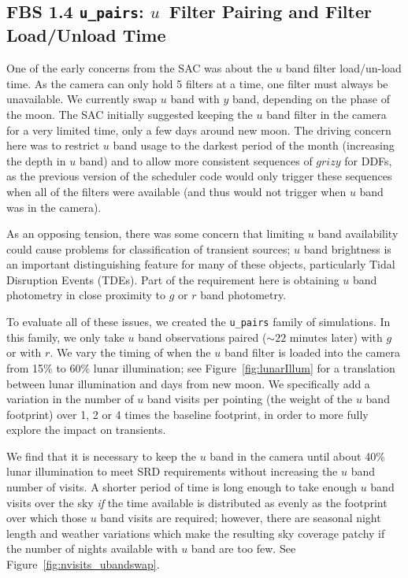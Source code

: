 \subsection{FBS 1.4 {\tt u\_pairs}:  $u$\ Filter Pairing and Filter Load/Unload Time}\label{ss:u_pairs}

One of the early concerns from the SAC was about the $u$ band filter load/un-load time. As the camera can only hold 5 filters at a time, one filter must always be unavailable. We currently swap $u$ band with $y$ band, depending on the phase of the moon. The SAC initially suggested keeping the $u$ band filter in the camera for a very limited time, only a few days around new moon. The driving concern here was to restrict $u$ band usage to the darkest period of the month (increasing the depth in $u$ band) and to allow more consistent sequences of $grizy$ for DDFs, as the previous version of the scheduler code would only trigger these sequences when all of the filters were available (and thus would not trigger when $u$ band was in the camera). 

As an opposing tension, there was some concern that limiting $u$ band availability could cause problems for classification of transient sources; $u$ band brightness is an important distinguishing feature for many of these objects, particularly Tidal Disruption Events (TDEs). Part of the requirement here is obtaining $u$ band photometry in close proximity to $g$ or $r$ band photometry. 

To evaluate all of these issues, we created the {\tt u\_pairs} family of simulations. In this family, we only take $u$ band observations paired ($\sim22$ minutes later) with $g$ or with $r$. We vary the timing of when the $u$ band filter is loaded into the camera from 15\% to 60\% lunar illumination; see Figure~\ref{fig:lunarIllum} for a translation between lunar illumination and days from new moon. We specifically add a variation in the  number of $u$ band visits per pointing (the weight of the $u$ band footprint) over 1, 2 or 4 times the baseline footprint, in order to more fully explore the impact on transients. 

We find that it is necessary to keep the $u$ band in the camera until about 40\% lunar illumination to meet SRD requirements without increasing the $u$ band number of visits. A shorter period of time is long enough to take enough $u$ band visits over the sky {\it if} the time available is distributed as evenly as the footprint over which those $u$ band visits are required; however, there are seasonal night length and weather variations which make the resulting sky coverage patchy if the number of nights available with $u$ band are too few.  See Figure~\ref{fig:nvisits_ubandswap}. 

